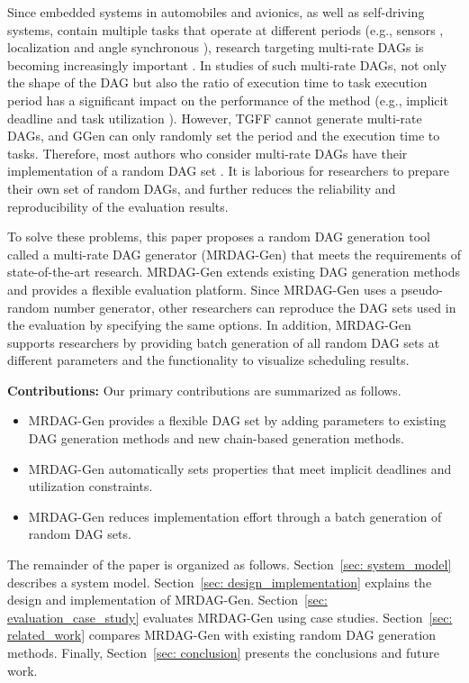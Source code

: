 Since embedded systems in automobiles and avionics, as well as self-driving systems, contain multiple tasks that operate at different periods (e.g., sensors \cite{guanindustry}, localization \cite{verucchi2020latency} and angle synchronous \cite{hamann2017communication}), research targeting multi-rate DAGs is becoming increasingly important \cite{gunzel2021suspension, kordon2020evaluation}.
In studies of such multi-rate DAGs, not only the shape of the DAG but also the ratio of execution time to task execution period has a significant impact on the performance of the method (e.g., implicit deadline \cite{ueter2021hard, cho2021conditionally} and task utilization \cite{nogd2020response, yang2020mixed}).
However, TGFF cannot generate multi-rate DAGs, and GGen can only randomly set the period and the execution time to tasks.
Therefore, most authors who consider multi-rate DAGs have their implementation of a random DAG set \cite{voronov2021ai, dong2019efficient, yang2020mixed, nogd2020response}.
It is laborious for researchers to prepare their own set of random DAGs, and further reduces the reliability and reproducibility of the evaluation results.

To solve these problems, this paper proposes a random DAG generation tool called a multi-rate DAG generator (MRDAG-Gen) that meets the requirements of state-of-the-art research.
MRDAG-Gen extends existing DAG generation methods and provides a flexible evaluation platform.
Since MRDAG-Gen uses a pseudo-random number generator, other researchers can reproduce the DAG sets used in the evaluation by specifying the same options.
In addition, MRDAG-Gen supports researchers by providing batch generation of all random DAG sets at different parameters and the functionality to visualize scheduling results.

\textbf{Contributions: } Our primary contributions are summarized as follows.
\begin{itemize}
    \item MRDAG-Gen provides a flexible DAG set by adding parameters to existing DAG generation methods and new chain-based generation methods.
    \item MRDAG-Gen automatically sets properties that meet implicit deadlines and utilization constraints.
    \item MRDAG-Gen reduces implementation effort through a batch generation of random DAG sets.
\end{itemize}

The remainder of the paper is organized as follows.
Section~\ref{sec: system_model} describes a system model.
Section~\ref{sec: design_implementation} explains the design and implementation of MRDAG-Gen.
Section~\ref{sec: evaluation_case_study} evaluates MRDAG-Gen using case studies.
Section~\ref{sec: related_work} compares MRDAG-Gen with existing random DAG generation methods.
Finally, Section~\ref{sec: conclusion} presents the conclusions and future work.

